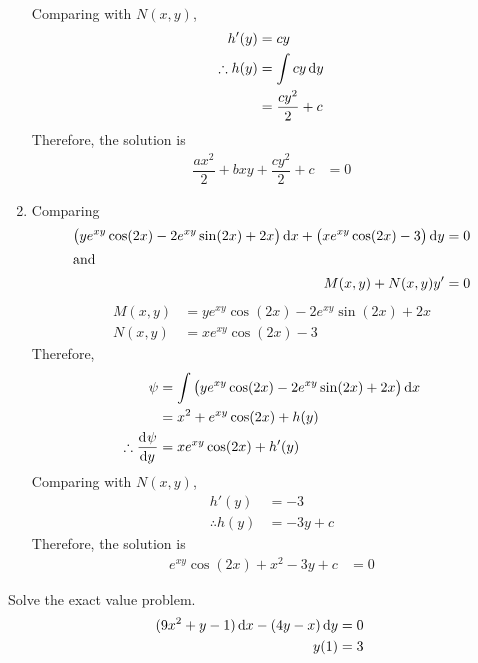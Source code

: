 \documentclass[fleqn, a4paper, 12pt, oneside]{amsart}
\theoremstyle{definition}
\theoremstyle{theorem}
\begin{document}
\begin{solution}
\begin{enumerate}[leftmargin=*]
\begin{align*}
			\end{align*}
			Comparing with $N(x,y)$,
			\begin{align*}
				h'(y) &= cy\\
				\therefore h(y) &= \int cy \dif y\\
				&= \dfrac{c y^2}{2} + c
			\end{align*}
			Therefore, the solution is
			\begin{align*}
				\dfrac{a x^2}{2} + bxy + \dfrac{c y^2}{2} + c &= 0
			\end{align*}
		\item
			Comparing
			\begin{align*}
				\left( y e^{xy} \cos (2x) - 2 e^{xy} \sin (2x) + 2x \right) \dif x + \left( x e^{xy} \cos (2x) - 3 \right) \dif y &= 0\\
				\intertext{and}
				M(x,y) + N(x,y) y' &= 0
			\end{align*}
			\begin{align*}
				M(x,y) &= y e^{xy} \cos (2x) - 2 e^{xy} \sin (2x) + 2x\\
				N(x,y) &= x e^{xy} \cos (2x) - 3
			\end{align*}
			Therefore,
			\begin{align*}
				\psi &= \int \left( y e^{xy} \cos (2x) - 2 e^{xy} \sin (2x) + 2x \right) \dif x\\
				&= x^2 + e^{xy} \cos (2x) + h(y)\\
				\therefore \dod{\psi}{y} &= x e^{xy} \cos (2x) + h'(y)
			\end{align*}
			Comparing with $N(x,y)$,
			\begin{align*}
				h'(y) &= -3\\
				\therefore h(y) &= -3y + c
			\end{align*}
			Therefore, the solution is
			\begin{align*}
				e^{xy} \cos (2x) + x^2 - 3y + c &= 0
			\end{align*}
	\end{enumerate}
\end{solution}

\begin{question}
	Solve the exact value problem.
	\begin{align*}
		(9x^2 + y - 1) \dif x - (4y - x) \dif y &= 0\\
		y(1) &= 3
	\end{align*}
\end{question}
\end{document}
